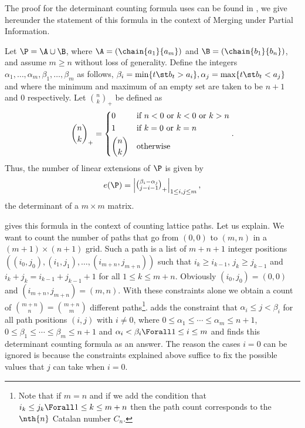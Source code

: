 The proof for the determinant counting formula \citet*{linial:1984} uses can be
found in \citet*{mohanty:1979}, we give hereunder the statement of this formula
in the context of Merging under Partial Information.
\begin{theorem}
Let \(\P = \A \cup \B\), where \(\A = (\chain{a_1}{a_m})\) and \(\B =
(\chain{b_1}{b_n})\), and assume \(m \ge n\) without loss of generality. Define
the integers \(\alpha_1,\ldots,\alpha_m,\beta_1,\ldots,\beta_m\) as follows,
\(\beta_i = \min\{t \st b_t > a_i\}, \alpha_j = \max\{t \st b_t < a_j\}\) and
where the minimum and maximum of an empty set are taken to be \(n + 1\) and
\(0\) respectively. Let \(\binom{n}{k}_{+}\) be defined as
\begin{displaymath}
\binom{n}{k}_{+} =
\begin{dcases*}
0            & if  \(n < 0\)  or \(k < 0\)  or \(k > n\)\\
1            & if \(k = 0\)  or \(k = n\)\\
\binom{n}{k} & otherwise\\
\end{dcases*}.
\end{displaymath}
Thus, the number of linear extensions of \(\P\) is given by
\begin{displaymath}
e(\P) =
\begin{vmatrix}
\binom{\beta_i - \alpha_j}{j - i - 1}_{+}
\end{vmatrix}_{1 \le i , j \le m},
\end{displaymath}
the determinant of a \(m \times m\) matrix.
\end{theorem}

\citet*{mohanty:1979} gives this formula in the context of counting lattice
paths. Let us explain. We want to count the number of paths that go from
\((0,0)\) to \((m,n)\) in a \((m+1) \times (n+1)\) grid. Such a path is a
list of \(m+n+1\) integer positions \(( (i_{0},j_{0}) , (i_{1},j_{1}) ,
\ldots , (i_{m+n},j_{m+n}) )\) such that \(i_{k} \ge i_{k-1}\), \(j_{k} \ge
j_{k-1}\) and \(i_{k} + j_{k} = i_{k-1} + j_{k-1} + 1\) for all \(1 \le k \le m
+ n\).  Obviously \((i_{0},j_{0}) = (0,0)\) and \((i_{m+n},j_{m+n}) = (m,n)\).
With these constraints alone we obtain a count of \(\binom{m+n}{n} =
\binom{m+n}{m} \) different paths\footnote{Note that if \(m = n\) and if we add
the condition that \(i_{k} \le j_{k} \Forall 1 \le k \le m + n\) then the path
count corresponds to the \(\nth{n}\) Catalan number \(C_n\).}.
\citet*{mohanty:1979} adds the constraint that \(\alpha_i \le j < \beta_i\) for
all path positions \((i,j)\) with \(i \neq 0\), where \(0 \le
\alpha_1 \le \cdots \le \alpha_m \le n + 1\), \(0 \le \beta_1 \le \cdots \le
\beta_m \le n + 1\) and \(\alpha_i < \beta_i \Forall 1 \le i \le m\) and finds
this determinant counting formula as an answer. The reason the cases \(i = 0\)
can be ignored is because the constraints explained above suffice to fix
the possible values that \(j\) can take when \(i = 0\).

